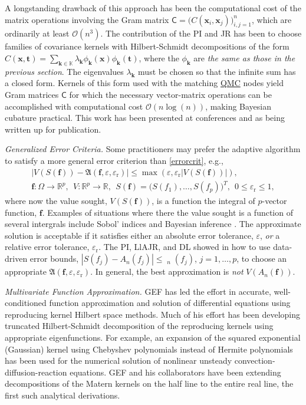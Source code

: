 \documentclass[11pt]{NSFamsart}
\newcommand{\QMC}{\hyperlink{QMClink}{QMC}\xspace}
\newcommand{\reals}{{\mathbb{R}}}
\newcommand{\vf}{\boldsymbol{f}}
\newcommand{\mC}{\mathsf{C}}
\newcommand{\bbK}{\mathbb{K}}
\DeclareMathOperator{\err}{err}
\DeclareMathOperator{\herr}{\widehat{\err}}
\newcommand{\bx}{{\boldsymbol{x}}}
\newcommand{\bk}{{\boldsymbol{k}}}
\newcommand{\bt}{{\boldsymbol{t}}}
\newcommand{\fA}{\mathfrak{A}}
\def\abs#1{\ensuremath{\left \lvert #1 \right \rvert}}
\newcommand{\Order}{\mathcal{O}}
\newcommand{\reltol}{\varepsilon_{\text{r}}}
\begin{document}
A longstanding drawback of this approach has been the computational cost of the matrix operations 
involving the Gram matrix $\mC = \bigl(C(\bx_i,\bx_j)\bigr)_{i,j=1}^n$, which are ordinarily at least 
$\Order(n^3)$.  The 
contribution of the PI and JR has been to choose families of covariance kernels with Hilbert-Schmidt 
decompositions of the form $C(\bx,\bt) = \sum_{\bk \in \bbK} \lambda_\bk \phi_{\bk}(\bx) 
\phi_{\bk}(\bt)$, where the $\phi_{\bk}$ are \emph{the same as those in the previous section}.  The 
eigenvalues $\lambda_\bk$ must be chosen so that the infinite sum has a closed form.  Kernels of 
this form used with the matching \QMC nodes yield Gram matrices $\mC$ for which the 
necessary vector-matrix operations can be accomplished with computational cost $\Order(n 
\log(n))$, making Bayesian cubature practical.  This work has been presented at conferences and 
as being written up for publication.

\emph{Generalized Error Criteria.}  Some practitioners may prefer the adaptive 
algorithm 
to satisfy a more general error 
criterion than \eqref{errorcrit}, e.g., 
\begin{multline}
\label{generrorcrit} \tag{G-CRIT}
\abs{V(S(\vf)) - \fA(\vf,\varepsilon, \reltol) } \le \max(\varepsilon, \reltol \abs{V(S(\vf))} ),  \\
 \vf: 
\Omega \to \reals^p, \ \ V: \reals^p \to \reals, \ \ S(\vf) = \bigl(S(f_1), \ldots, S(f_p) \bigr)^T, \ \  0 \le 
\reltol \le 1,
\end{multline}
where now the value sought, $V(S(\vf))$, is a function the integral of $p$-vector function, 
$\vf$. Examples of situations where there the value sought is a function of several intergrals include 
Sobol' indices \cite{Sal02a} and Bayesian inference \cite{GelEtal13}.  The approximate solution is 
acceptable if it 
satisfies either an absolute error tolerance, 
$\varepsilon$, \emph{or} a relative error tolerance, $\reltol$.  The PI, LlAJR, and DL showed in 
\cite{HicEtal17a} how to use data-driven error bounds, $\abs{S(f_j) - A_n(f_j)} \le \herr_{n}(f_j)$, $j = 
1, \ldots, p$,  to 
choose an appropriate $\fA(\vf,\varepsilon, \reltol)$.  In general, the 
best approximation is \emph{not} $V(A_n(\vf))$.  


\emph{Multivariate Function Approximation.}
GEF has led the effort in accurate, well-conditioned function approximation and solution of 
differential equations using reproducing kernel Hilbert space methods.  Much of his effort has been 
developing truncated Hilbert-Schmidt decomposition of the reproducing kernels using appropriate 
eigenfunctions.  For example, an expansion of the squared exponential (Gaussian) kernel using 
Chebyshev polynomials instead of Hermite polynomials has been used for the numerical solution of 
nonlinear unsteady 
convection-diffusion-reaction equations.  GEF and his collaborators have been extending 
decompositions of the Matern kernels on the half line to the entire real line, the first such analytical 
derivations.
\end{document}
